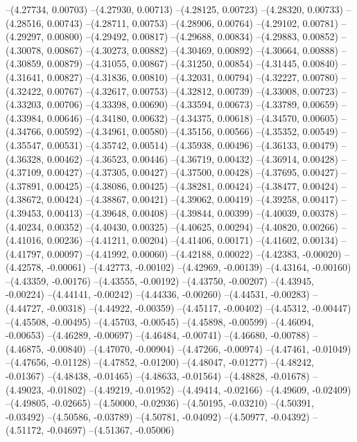 --(4.27734, 0.00703)
--(4.27930, 0.00713)
--(4.28125, 0.00723)
--(4.28320, 0.00733)
--(4.28516, 0.00743)
--(4.28711, 0.00753)
--(4.28906, 0.00764)
--(4.29102, 0.00781)
--(4.29297, 0.00800)
--(4.29492, 0.00817)
--(4.29688, 0.00834)
--(4.29883, 0.00852)
--(4.30078, 0.00867)
--(4.30273, 0.00882)
--(4.30469, 0.00892)
--(4.30664, 0.00888)
--(4.30859, 0.00879)
--(4.31055, 0.00867)
--(4.31250, 0.00854)
--(4.31445, 0.00840)
--(4.31641, 0.00827)
--(4.31836, 0.00810)
--(4.32031, 0.00794)
--(4.32227, 0.00780)
--(4.32422, 0.00767)
--(4.32617, 0.00753)
--(4.32812, 0.00739)
--(4.33008, 0.00723)
--(4.33203, 0.00706)
--(4.33398, 0.00690)
--(4.33594, 0.00673)
--(4.33789, 0.00659)
--(4.33984, 0.00646)
--(4.34180, 0.00632)
--(4.34375, 0.00618)
--(4.34570, 0.00605)
--(4.34766, 0.00592)
--(4.34961, 0.00580)
--(4.35156, 0.00566)
--(4.35352, 0.00549)
--(4.35547, 0.00531)
--(4.35742, 0.00514)
--(4.35938, 0.00496)
--(4.36133, 0.00479)
--(4.36328, 0.00462)
--(4.36523, 0.00446)
--(4.36719, 0.00432)
--(4.36914, 0.00428)
--(4.37109, 0.00427)
--(4.37305, 0.00427)
--(4.37500, 0.00428)
--(4.37695, 0.00427)
--(4.37891, 0.00425)
--(4.38086, 0.00425)
--(4.38281, 0.00424)
--(4.38477, 0.00424)
--(4.38672, 0.00424)
--(4.38867, 0.00421)
--(4.39062, 0.00419)
--(4.39258, 0.00417)
--(4.39453, 0.00413)
--(4.39648, 0.00408)
--(4.39844, 0.00399)
--(4.40039, 0.00378)
--(4.40234, 0.00352)
--(4.40430, 0.00325)
--(4.40625, 0.00294)
--(4.40820, 0.00266)
--(4.41016, 0.00236)
--(4.41211, 0.00204)
--(4.41406, 0.00171)
--(4.41602, 0.00134)
--(4.41797, 0.00097)
--(4.41992, 0.00060)
--(4.42188, 0.00022)
--(4.42383, -0.00020)
--(4.42578, -0.00061)
--(4.42773, -0.00102)
--(4.42969, -0.00139)
--(4.43164, -0.00160)
--(4.43359, -0.00176)
--(4.43555, -0.00192)
--(4.43750, -0.00207)
--(4.43945, -0.00224)
--(4.44141, -0.00242)
--(4.44336, -0.00260)
--(4.44531, -0.00283)
--(4.44727, -0.00318)
--(4.44922, -0.00359)
--(4.45117, -0.00402)
--(4.45312, -0.00447)
--(4.45508, -0.00495)
--(4.45703, -0.00545)
--(4.45898, -0.00599)
--(4.46094, -0.00653)
--(4.46289, -0.00697)
--(4.46484, -0.00741)
--(4.46680, -0.00788)
--(4.46875, -0.00840)
--(4.47070, -0.00904)
--(4.47266, -0.00974)
--(4.47461, -0.01049)
--(4.47656, -0.01128)
--(4.47852, -0.01200)
--(4.48047, -0.01277)
--(4.48242, -0.01367)
--(4.48438, -0.01465)
--(4.48633, -0.01564)
--(4.48828, -0.01678)
--(4.49023, -0.01802)
--(4.49219, -0.01952)
--(4.49414, -0.02166)
--(4.49609, -0.02409)
--(4.49805, -0.02665)
--(4.50000, -0.02936)
--(4.50195, -0.03210)
--(4.50391, -0.03492)
--(4.50586, -0.03789)
--(4.50781, -0.04092)
--(4.50977, -0.04392)
--(4.51172, -0.04697)
--(4.51367, -0.05006)
